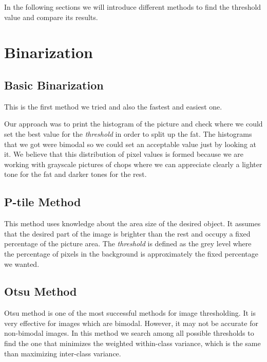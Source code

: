 \documentclass[12]{article}
\begin{document}
In the following sections we will introduce different methods to find the threshold value and compare its results.

\section{Binarization}
\subsection{Basic Binarization}
This is the first method we tried and also the fastest and easiest one. 

\noindent Our approach was to print the histogram of the picture and check where we could set the best value for the \textit{threshold} in order to split up the fat. The histograms that we got were bimodal so we could set an acceptable value just by looking at it. We believe that this distribution of pixel values is formed because we are working with grayscale pictures of chops where we can appreciate clearly a lighter tone for the fat and darker tones for the rest.
\subsection{P-tile Method}
This method uses knowledge about the area size of the desired object. It assumes that the desired part of the image is brighter than the rest and occupy a fixed percentage of the picture area. The \textit{threshold} is defined as the grey level where the percentage of pixels in the background is approximately the fixed percentage we wanted.

\subsection{Otsu Method}
Otsu method is one of the most successful methods for image thresholding. It is very effective for images which are bimodal. However, it may not be accurate for non-bimodal images. In this method we search among all possible thresholds to find the one that minimizes the weighted within-class variance, which is the same than maximizing inter-class variance.
\end{document}
